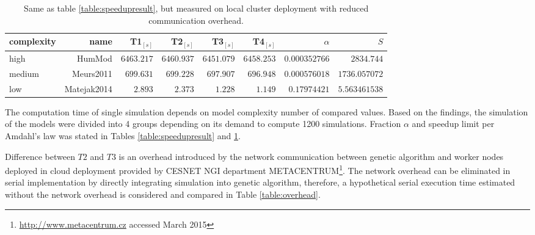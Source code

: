 \begin{table}[htb]
\footnotesize
\begin{tabular}{|l|r|r|r|r|r|r|r|}
\hline
complexity & name & T1$_{[s]}$ & T2$_{[s]}$ & T3$_{[s]}$ & T4$_{[s]}$ & $\alpha$ & $S$ \\
\hline
high & HumMod \cite{Kofranek2011hummod} & $\num{6463.217}$ & $\num{6460.937}$ & $\num{6451.079}$ & $\num{6458.253}$ & $\num{0.000352766}$ & $\num{2834.744}$ \\
medium & Meurs2011\cite{Meurs2011} & $\num{699.631}$ & $\num{699.228}$ & $\num{697.907}$ & $\num{696.948}$ & $\num{0.000576018}$ & $\num{1736.057072}$ \\
low & Matejak2014\cite{Matejak2014sj} & $\num{2.893}$ & $\num{2.373}$ & $\num{1.228}$ & $\num{1.149}$ & $\num{0.17974421}$ & $\num{5.563461538}$\\ \hline
\end{tabular}
\caption{Same as table \ref{table:speedupresult}, but measured on local cluster deployment with reduced communication overhead.}
\label{table:speedupresult2}
\end{table}

The computation time of single simulation depends on model complexity number of compared values. Based on the findings, the simulation of the models were divided into 4 groups depending on its demand to compute 1200 simulations. Fraction $\alpha$ and speedup limit per Amdahl's law was stated in Tables \ref{table:speedupresult} and \ref{table:speedupresult2}. 

Difference between $T2$ and $T3$ is an overhead introduced by the network communication between genetic algorithm and worker nodes deployed in cloud deployment provided by CESNET NGI department METACENTRUM\footnote{\url{http://www.metacentrum.cz} accessed March 2015}. The network overhead can be eliminated in serial implementation by directly integrating simulation into genetic algorithm, therefore, a hypothetical serial execution time estimated without the network overhead is considered and compared in Table \ref{table:overhead}.

